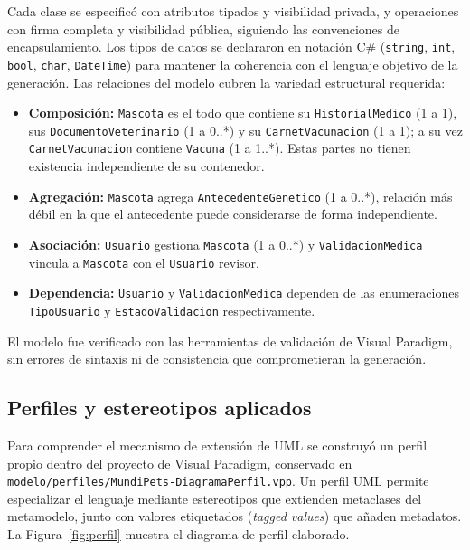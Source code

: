 \documentclass[journal,onecolumn]{IEEEtran}
\begin{document}
	Cada clase se especificó con atributos tipados y visibilidad privada, y operaciones con firma completa y visibilidad pública, siguiendo las convenciones de encapsulamiento. Los tipos de datos se declararon en notación C\# (\texttt{string}, \texttt{int}, \texttt{bool}, \texttt{char}, \texttt{DateTime}) para mantener la coherencia con el lenguaje objetivo de la generación. Las relaciones del modelo cubren la variedad estructural requerida:
	
	\begin{itemize}[leftmargin=*, itemsep=2pt]
		\item \textbf{Composición:} \texttt{Mascota} es el todo que contiene su \texttt{HistorialMedico} (1 a 1), sus \texttt{DocumentoVeterinario} (1 a 0..*) y su \texttt{CarnetVacunacion} (1 a 1); a su vez \texttt{CarnetVacunacion} contiene \texttt{Vacuna} (1 a 1..*). Estas partes no tienen existencia independiente de su contenedor.
		\item \textbf{Agregación:} \texttt{Mascota} agrega \texttt{AntecedenteGenetico} (1 a 0..*), relación más débil en la que el antecedente puede considerarse de forma independiente.
		\item \textbf{Asociación:} \texttt{Usuario} gestiona \texttt{Mascota} (1 a 0..*) y \texttt{ValidacionMedica} vincula a \texttt{Mascota} con el \texttt{Usuario} revisor.
		\item \textbf{Dependencia:} \texttt{Usuario} y \texttt{ValidacionMedica} dependen de las enumeraciones \texttt{TipoUsuario} y \texttt{EstadoValidacion} respectivamente.
	\end{itemize}
	
	El modelo fue verificado con las herramientas de validación de Visual Paradigm, sin errores de sintaxis ni de consistencia que comprometieran la generación.
	
	\subsection{Perfiles y estereotipos aplicados}\label{sec:perfiles_estereotipos}
	
	Para comprender el mecanismo de extensión de UML se construyó un perfil propio dentro del proyecto de Visual Paradigm, conservado en \texttt{modelo/perfiles/MundiPets-DiagramaPerfil.vpp}. Un perfil UML permite especializar el lenguaje mediante estereotipos que extienden metaclases del metamodelo, junto con valores etiquetados (\emph{tagged values}) que añaden metadatos. La Figura~\ref{fig:perfil} muestra el diagrama de perfil elaborado.
	
\end{document}
